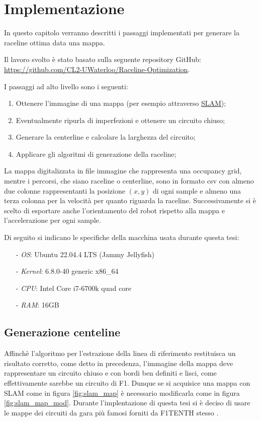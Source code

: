 
\chapter{Implementazione}
In questo capitolo verranno descritti i passaggi implementati per generare la raceline ottima data una
mappa.

Il lavoro svolto è stato basato sulla seguente repository GitHub:
\url{https://github.com/CL2-UWaterloo/Raceline-Optimization}.

\bigskip
\noindent I passaggi ad alto livello sono i seguenti:
\begin{enumerate}
	\item Ottenere l'immagine di una mappa (per esempio attraverso \hyperref[par:slam]{SLAM});
	\item Eventualmente ripurla di imperfezioni e ottenere un circuito chiuso; 
	\item Generare la centerline e calcolare la larghezza del circuito;
	\item Applicare gli algoritmi di generazione della raceline;
\end{enumerate}

La mappa digitalizzata in file immagine che rappresenta una occupancy grid, mentre
i percorsi, che siano raceline o centerline, sono in formato csv con almeno due colonne rappresentanti la
posizione $(x,y)$ di ogni sample e almeno una terza colonna per la velocità per quanto riguarda la
raceline. Successivamente si è scelto di esportare anche l'orientamento del robot rispetto alla mappa e
l'accelerazione per ogni sample.

\bigskip
\noindent Di seguito si indicano le specifiche della macchina usata durante questa tesi:
\begin{itemize}
	\item[-] \textit{OS}: Ubuntu 22.04.4 LTS (Jammy Jellyfish)
	\item[-] \textit{Kernel}: 6.8.0-40 generic x86\_64
	\item[-] \textit{CPU}: Intel Core i7-6700k quad core
	\item[-] \textit{RAM}: 16GB
\end{itemize}

\section{Generazione centeline}
Affinchè l'algoritmo per l'estrazione della linea di riferimento restituisca un risultato corretto, come
detto in precedenza, l'immagine della mappa deve rappresentare un circuito chiuso e con bordi ben
definiti e lisci, come effettivamente sarebbe un circuito di F1.
Dunque se si acquisice una mappa con SLAM come in figura \ref{fig:slam_map} è necessario modificarla come
in figura \ref{fig:slam_map_mod}. Durante l'implentazione di questa tesi si è deciso di usare le mappe
dei circuiti da gara più famosi forniti da F1TENTH stesso \cite{f1tenth-gitmaps}.

